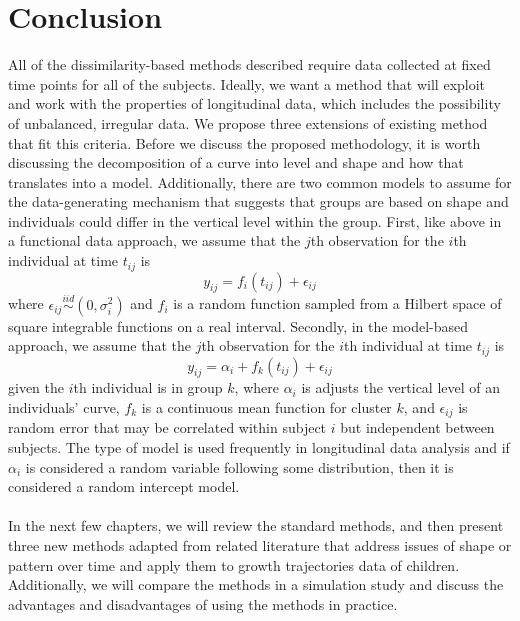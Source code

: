\documentclass[12pt]{article}
\begin{document}
\section{Conclusion}
All of the dissimilarity-based methods described require data collected at fixed time points for all of the subjects. Ideally, we want a method that will exploit and work with the properties of longitudinal data, which includes the possibility of unbalanced, irregular data. We propose three extensions of existing method that fit this criteria. Before we discuss the proposed methodology, it is worth discussing the decomposition of a curve into level and shape and how that translates into a model. Additionally,  there are two common models to assume for the data-generating mechanism that suggests that groups are based on shape and individuals could differ in the vertical level within the group. First, like above in a functional data approach, we assume that the $j$th observation for the $i$th individual at time $t_{ij}$ is
$$y_{ij}= f_i(t_{ij})+\epsilon_{ij}$$
where $\epsilon_{ij}\overset{iid}{\sim} (0,\sigma_{i}^{2})$ and $f_{i}$ is a random function sampled from a Hilbert space of square integrable functions on a real interval. Secondly, in the model-based approach, we assume that the $j$th observation for the $i$th individual at time $t_{ij}$ is
$$y_{ij}=\alpha_i+f_k(t_{ij})+\epsilon_{ij}$$
given the $i$th individual is in group $k$, where $\alpha_i$ is adjusts the vertical level of an individuals' curve, $f_k$ is a continuous mean function for cluster $k$, and $\epsilon_{ij}$ is random error that may be correlated within subject $i$ but independent between subjects. The type of model is used frequently in longitudinal data analysis \cite{diggle2002} and if $\alpha_{i}$ is considered a random variable following some distribution, then it is considered a random intercept model. \\\\
 In the next few chapters, we will review the standard methods, and then present three new methods adapted from related literature that address issues of shape or pattern over time and apply them to growth trajectories data of children. Additionally, we will compare the methods in a simulation study and discuss the advantages and disadvantages of using the methods in practice. 
	
	
\end{document}

